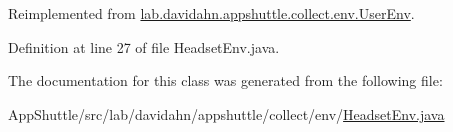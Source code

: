 \-Reimplemented from \hyperlink{classlab_1_1davidahn_1_1appshuttle_1_1collect_1_1env_1_1_user_env_aa6f13b1e505775ee853a4acb372da083}{lab.\-davidahn.\-appshuttle.\-collect.\-env.\-User\-Env}.



\-Definition at line 27 of file \-Headset\-Env.\-java.



\-The documentation for this class was generated from the following file\-:\begin{DoxyCompactItemize}
\item 
\-App\-Shuttle/src/lab/davidahn/appshuttle/collect/env/\hyperlink{_headset_env_8java}{\-Headset\-Env.\-java}\end{DoxyCompactItemize}
